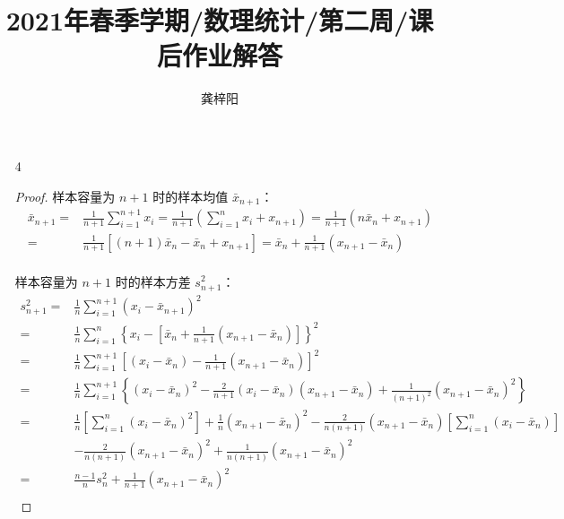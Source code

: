 \documentclass[normal,founder,mtpro2,cn]{elegantnote}
\title{2021年春季学期/数理统计/第二周/课后作业解答}
\author{龚梓阳}
\date{\zhtoday}
\begin{document}
    \maketitle
    \begin{enumerate}
        \item[4]
        \begin{proof}
            样本容量为 $n+1$ 时的样本均值 $\bar{x}_{n+1}$：
            \begin{equation*}
                \begin{aligned}
                    \bar{x}_{n+1}=&\frac{1}{n+1}\sum_{i=1}^{n+1}x_i=\frac{1}{n+1}\left(\sum_{i=1}^nx_i+x_{n+1}\right)=\frac{1}{n+1}\left(n\bar{x}_n+x_{n+1}\right) \\
                    =&\frac{1}{n+1}[\left(n+1\right)\bar{x}_n-\bar{x}_n+x_{n+1}]=\bar{x}_n+\frac{1}{n+1}\left(x_{n+1}-\bar{x}_n\right) \\
                \end{aligned}
            \end{equation*}
    
            样本容量为 $n+1$ 时的样本方差 $s^2_{n+1}$：
            \begin{equation*}
                \begin{aligned}
                    s^2_{n+1}=&\frac{1}{n}\sum_{i=1}^{n+1}\left(x_i-\bar{x}_{n+1}\right)^2 \\
                    =&\frac{1}{n}\sum_{i=1}^{n}\left\{x_i-\left[\bar{x}_n+\frac{1}{n+1}\left(x_{n+1}-\bar{x}_n\right)\right]\right\}^2 \\
                    =&\frac{1}{n}\sum_{i=1}^{n+1}\left[\left(x_i-\bar{x}_n\right)-\frac{1}{n+1}\left(x_{n+1}-\bar{x}_n\right)\right]^2 \\
                    =&\frac{1}{n}\sum_{i=1}^{n+1}\left\{\left(x_i-\bar{x}_n\right)^2-\frac{2}{n+1}\left(x_i-\bar{x}_n\right)\left(x_{n+1}-\bar{x}_n\right)+\frac{1}{\left(n+1\right)^2}\left(x_{n+1}-\bar{x}_n\right)^2\right\} \\
                    =&\frac{1}{n}\left[\sum_{i=1}^{n}\left(x_i-\bar{x}_n\right)^2\right]+\frac{1}{n}\left(x_{n+1}-\bar{x}_n\right)^2-\frac{2}{n\left(n+1\right)}\left(x_{n+1}-\bar{x}_n\right)\left[\sum_{i=1}^n\left(x_i-\bar{x}_n\right)\right] \\
                    &-\frac{2}{n\left(n+1\right)}\left(x_{n+1}-\bar{x}_n\right)^2+\frac{1}{n\left(n+1\right)}\left(x_{n+1}-\bar{x}_n\right)^2 \\
                    =&\frac{n-1}{n}s_{n}^{2}+\frac{1}{n+1}\left(x_{n+1}-\bar{x}_{n}\right)^{2} \\
                \end{aligned}
            \end{equation*}


\end{proof}
\end{enumerate}
\end{document}

